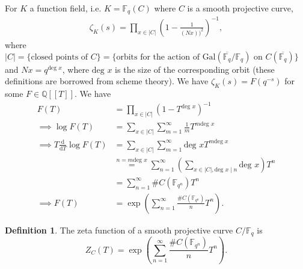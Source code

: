\documentclass{article}
\theoremstyle{definition}
\newtheorem{defn}{Definition}[section]
\begin{document}
For $K$ a function field, i.e. $K = \mathbb{F}_q(C)$ where $C$ is a smooth projective curve,
\begin{align*}
    \zeta_K(s) = \prod_{x \in \left|C\right|} \left(1-\frac{1}{(Nx))^2}\right)^{-1}, 
\end{align*}
where $\left|C\right| = \{\text{closed points of }C\} = \{\text{orbits for the action of Gal}(\overline{\mathbb{F}_q}/\mathbb{F}_q) \text{ on }C(\overline{\mathbb{F}_q})\}$ and $Nx = q^{\text{deg }x}$, where $\text{deg }x$ is the size of the corresponding orbit (these definitions are borrowed from scheme theory). We have $\zeta_K(s) = F(q^{-s})$ for some $F \in \mathbb{Q}[[T]]$. We have
\begin{align*}
    F(T) &= \prod_{x \in \left|C\right|}^{} \left(1-T^{\text{deg }x}\right)^{-1} \\
    \implies \log F(T) &= \sum_{x \in \left|C\right|}^{} \sum_{m=1}^{\infty} \frac{1}{m}T^{m \text{deg }x} \\
    \implies T\frac{\mathrm{d}}{\mathrm{d}T} \log F(T) &= \sum_{x \in \left|C\right|}^{} \sum_{m=1}^{\infty} \text{deg }x T^{m \text{deg }x} \\
    &\stackrel{n = m\text{deg }x}{=} \sum_{n=1}^{\infty} \left(\sum_{x \in \left|C\right|,\text{deg }x \mid n}^{} \text{deg }x \right)T^n \\
    &= \sum_{n=1}^{\infty} \# C(\mathbb{F}_{q^n})T^n \\
    \implies F(T) &= \exp \left(\sum_{n=1}^{\infty} \frac{\# C(\mathbb{F}_{q^n})}{n}T^n \right).
\end{align*}
\begin{defn}
    The zeta function of a smooth projective curve $C/\mathbb{F}_q$ is 
    \[
    Z_C(T) = \exp \left(\sum_{n=1}^{\infty} \frac{\# C(\mathbb{F}_{q^n})}{n}T^n \right).
    \]
\end{defn}
\end{document}
